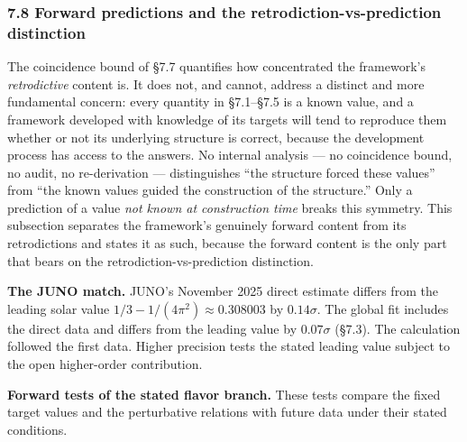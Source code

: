 \documentclass[
]{article}
\begin{document}
\hypertarget{forward-predictions-and-the-retrodiction-vs-prediction-distinction}{%
\subsubsection{7.8 Forward predictions and the
retrodiction-vs-prediction
distinction}\label{forward-predictions-and-the-retrodiction-vs-prediction-distinction}}

The coincidence bound of §7.7 quantifies how concentrated the
framework's \emph{retrodictive} content is. It does not, and cannot,
address a distinct and more fundamental concern: every quantity in
§7.1--§7.5 is a known value, and a framework developed with knowledge of
its targets will tend to reproduce them whether or not its underlying
structure is correct, because the development process has access to the
answers. No internal analysis --- no coincidence bound, no audit, no
re-derivation --- distinguishes ``the structure forced these values''
from ``the known values guided the construction of the structure.'' Only
a prediction of a value \emph{not known at construction time} breaks
this symmetry. This subsection separates the framework's genuinely
forward content from its retrodictions and states it as such, because
the forward content is the only part that bears on the
retrodiction-vs-prediction distinction.

\textbf{The JUNO match.} JUNO's November 2025 direct estimate differs
from the leading solar value \(1/3-1/(4\pi^2)\approx0.308003\) by
\(0.14\sigma\). The global fit includes the direct data and differs from
the leading value by \(0.07\sigma\) (§7.3). The calculation followed the
first data. Higher precision tests the stated leading value subject to
the open higher-order contribution.

\textbf{Forward tests of the stated flavor branch.} These tests compare
the fixed target values and the perturbative relations with future data
under their stated conditions.
\end{document}
